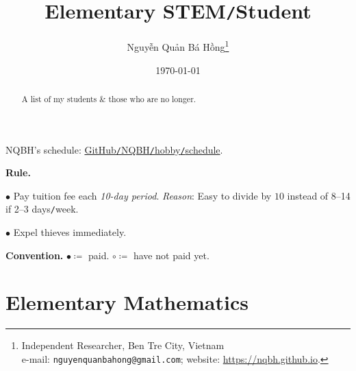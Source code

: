 \documentclass{article}
\title{Elementary STEM\texttt{/}Student}
\author{\selectlanguage{vietnamese} Nguyễn Quản Bá Hồng\footnote{Independent Researcher, Ben Tre City, Vietnam\\e-mail: \texttt{nguyenquanbahong@gmail.com}; website: \url{https://nqbh.github.io}.}}
\date{\today}
\numberwithin{equation}{section}
\begin{document}
\maketitle
{}
\begin{abstract}
	A list of my students \& those who are no longer.
\end{abstract}
\tableofcontents
\newpage


NQBH's schedule: \href{https://github.com/NQBH/hobby/blob/master/schedule/NQBH_schedule.pdf}{GitHub\texttt{/}NQBH\texttt{/}hobby\texttt{/}schedule}.

\textbf{Rule.}
\begin{enumerate*}
	\item[$\bullet$] Pay tuition fee each \textit{10-day period}. \textit{Reason}: Easy to divide by $10$ instead of 8--14 if 2--3 days\texttt{/}week.
	\item[$\bullet$] Expel thieves immediately.
\end{enumerate*}

\textbf{Convention.} $\bullet\coloneq$ paid. $\circ\coloneq$ have not paid yet. 

\section{Elementary Mathematics}
\end{document}

